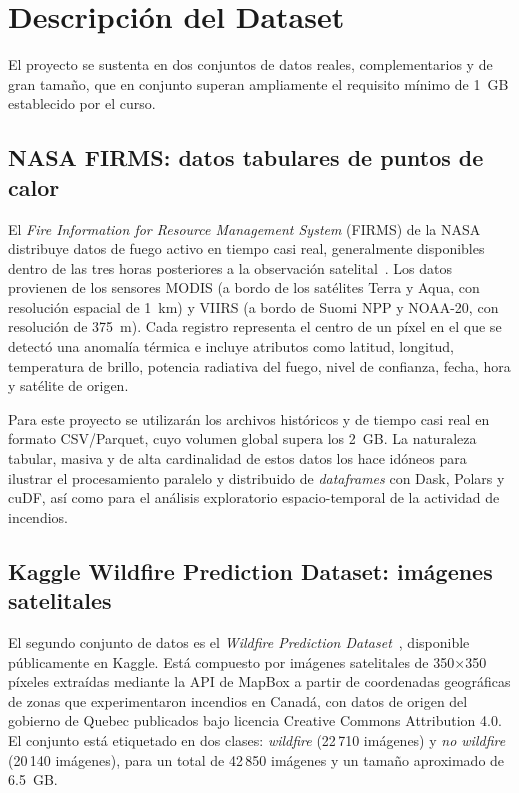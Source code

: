 \section{Descripción del Dataset}
\label{sec:dataset}

El proyecto se sustenta en dos conjuntos de datos reales, complementarios y de gran tamaño, que en conjunto superan ampliamente el requisito mínimo de 1~GB establecido por el curso.

\subsection{NASA FIRMS: datos tabulares de puntos de calor}
El \textit{Fire Information for Resource Management System} (FIRMS) de la NASA distribuye datos de fuego activo en tiempo casi real, generalmente disponibles dentro de las tres horas posteriores a la observación satelital~\cite{nasafirms}. Los datos provienen de los sensores MODIS (a bordo de los satélites Terra y Aqua, con resolución espacial de 1~km) y VIIRS (a bordo de Suomi NPP y NOAA-20, con resolución de 375~m). Cada registro representa el centro de un píxel en el que se detectó una anomalía térmica e incluye atributos como latitud, longitud, temperatura de brillo, potencia radiativa del fuego, nivel de confianza, fecha, hora y satélite de origen.

Para este proyecto se utilizarán los archivos históricos y de tiempo casi real en formato CSV/Parquet, cuyo volumen global supera los 2~GB. La naturaleza tabular, masiva y de alta cardinalidad de estos datos los hace idóneos para ilustrar el procesamiento paralelo y distribuido de \textit{dataframes} con Dask, Polars y cuDF, así como para el análisis exploratorio espacio-temporal de la actividad de incendios.

\subsection{Kaggle Wildfire Prediction Dataset: imágenes satelitales}
El segundo conjunto de datos es el \textit{Wildfire Prediction Dataset}~\cite{kaggle}, disponible públicamente en Kaggle. Está compuesto por imágenes satelitales de 350$\times$350 píxeles extraídas mediante la API de MapBox a partir de coordenadas geográficas de zonas que experimentaron incendios en Canadá, con datos de origen del gobierno de Quebec publicados bajo licencia Creative Commons Attribution 4.0. El conjunto está etiquetado en dos clases: \textit{wildfire} (22\,710 imágenes) y \textit{no wildfire} (20\,140 imágenes), para un total de 42\,850 imágenes y un tamaño aproximado de 6.5~GB.

